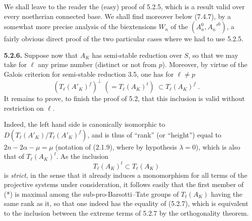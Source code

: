 \documentclass[11pt]{article}
\theoremstyle{plain}
\theoremstyle{definition}
\theoremstyle{remark}
\newcommand{\Tl}{T_\ell}
\begin{document}
We shall leave to the reader the (easy) proof of 5.2.5, which is a
result valid over every noetherian connected base. We shall find
moreover below (7.4.7), by a somewhat more precise analysis of the
biextensions $W_n$ of the $(A_n^0, A_n'^0)$, a fairly obvious direct
proof of the two particular cases where we had to use 5.2.5.

\medskip

\noindent\textbf{5.2.6.} Suppose now that $A_K$ has semi-stable reduction
over $S$, so that we may take for $\ell$ any prime number (distinct or
not from $p$). Moreover, by virtue of the Galois criterion for
semi-stable reduction 3.5, one has for $\ell \neq p$
\begin{equation}
(\Tl(A'_K)^f)^{\perp} \;(= \Tl(A_K)^t)\; \subset \Tl(A_K)^f \; .
\end{equation}
It remains to prove, to finish the proof of 5.2, that this inclusion is
valid without restriction on $\ell$.

Indeed, the left hand side is canonically isomorphic to
$D(\Tl(A'_K)/\Tl(A'_K)^f)$, and is thus of ``rank'' (or ``height'')
equal to $2n - 2\alpha - \mu = \mu$ (notation of (2.1.9), where by
hypothesis $\lambda = 0$), which is also that of $\Tl(A_K)^t$. As the
inclusion
\[
\Tl(A_K)^t \subset \Tl(A_K)
\]
is \emph{strict}, in the sense that it already induces a monomorphism
for all terms of the projective systems under consideration, it follows
easily that the first member of (*) is maximal among the
sub-pro-Barsotti--Tate groups of $\Tl(A_K)$ having the same rank as it,
so that one indeed has the equality of (5.2.7), which is equivalent to
the inclusion between the extreme terms of 5.2.7 by the orthogonality
theorem.

\medskip
\end{document}
